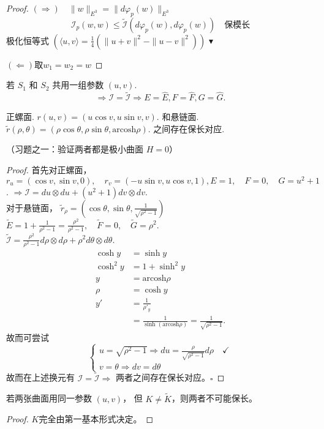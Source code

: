 \documentclass[lang=cn,10pt,thmcnt=section]{elegantbook}
\begin{document}
\begin{proof}
    $(\Rightarrow) \quad \|w\|_{E^3} = \|d\varphi_p(w)\|_{E^3} $\\
\[
\mathcal{I}_p(w, w) \leq \widetilde{\mathcal{I}}(d\varphi_p(w), d\varphi_p(w)) \quad \text{保模长}
\]
极化恒等式 $(\langle u, v \rangle = \frac{1}{4}(\|u+v\|^2 - \|u-v\|^2))$ \quad {} $\blacktriangledown$

 $(\Leftarrow) \text{取} w_1 = w_2 = w$
\end{proof}
\begin{corollary}
    若 $S_1$ 和 $S_2$ 共用一组参数 $(u,v)$. 
\[
\Rightarrow \mathcal{I} = \widetilde{\mathcal{I}} \Rightarrow E = \widehat{E}, F = \widehat{F}, G = \widehat{G}.
\]
\end{corollary}
\begin{example}
    正螺面. 
$r(u,v) = (u \cos v, u \sin v, v)$. 
和悬链面. $\widetilde{r}(\rho, \theta) = (\rho \cos \theta, \rho \sin \theta, \text{arcosh} \rho)$. 
之间存在保长对应. 

（习题之一：验证两者都是极小曲面 $H=0$）
\end{example}
\begin{proof}
    首先对正螺面，
$$r_u = (\cos v, \sin v, 0), \quad r_v = (-u \sin v, u \cos v, 1),E = 1, \quad F = 0, \quad G = u^2 + 1$$. 
$\Rightarrow \mathcal{I} = du \otimes du + (u^2 + 1) dv \otimes dv$. \\

对于悬链面，
$\widetilde{r}_\rho = (\cos \theta, \sin \theta, \frac{1}{\sqrt{\rho^2 - 1}})$ 
$\widetilde{E} = 1 + \frac{1}{\rho^2 - 1} = \frac{\rho^2}{\rho^2 - 1}, \quad \widetilde{F} = 0, \quad \widetilde{G} = \rho^2$. \\
$\widetilde{\mathcal{I}} = \frac{\rho^2}{\rho^2 - 1} d\rho \otimes d\rho + \rho^2 d\theta \otimes d\theta$. \\

\begin{align*}
\cosh y &= \sinh y \\
\cosh^2 y &= 1 + \sinh^2 y \\
y &= \text{arcosh} \rho \\
\rho &= \cosh y \\
y' &= \frac{1}{\rho'_y} \\
&= \frac{1}{\sinh(\text{arcosh} \rho)} = \frac{1}{\sqrt{\rho^2 - 1}}.
\end{align*}
故而可尝试
\[
\left\{
\begin{array}{l}
u = \sqrt{\rho^2 - 1} \Rightarrow du = \frac{\rho}{\sqrt{\rho^2 - 1}} d\rho \quad \checkmark \\
v = \theta \Rightarrow dv = d\theta
\end{array}
\right.
\]
故而在上述换元有 $\boxed{\mathcal{I} = \widetilde{\mathcal{I}}} \Rightarrow$ 两者之间存在保长对应。$\square$
\end{proof}
\begin{proposition}
    若两张曲面用同一参数 $(u,v)$，
但 $K \neq \widetilde{K}$，则两者不可能保长。

\end{proposition}
\begin{proof}
    $K$完全由第一基本形式决定。
\end{proof}
\end{document}
